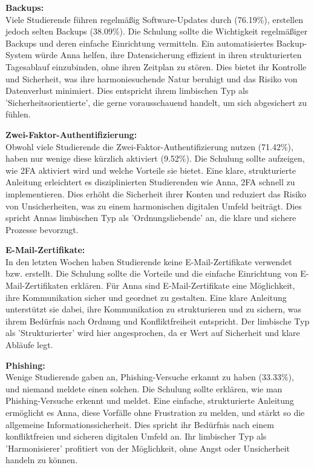 \documentclass[german,report]{i1thesis}
\begin{document}
\textbf{Backups:}\\
Viele Studierende führen regelmäßig Software-Updates durch (76.19\%), erstellen jedoch selten Backups (38.09\%). Die Schulung sollte die Wichtigkeit regelmäßiger Backups und deren einfache Einrichtung vermitteln. Ein automatisiertes Backup-System würde Anna helfen, ihre Datensicherung effizient in ihren strukturierten Tagesablauf einzubinden, ohne ihren Zeitplan zu stören. Dies bietet ihr Kontrolle und Sicherheit, was ihre harmoniesuchende Natur beruhigt und das Risiko von Datenverlust minimiert. Dies entspricht ihrem limbischen Typ als 'Sicherheitsorientierte', die gerne vorausschauend handelt, um sich abgesichert zu fühlen.

\textbf{Zwei-Faktor-Authentifizierung:}\\
Obwohl viele Studierende die Zwei-Faktor-Authentifizierung nutzen (71.42\%), haben nur wenige diese kürzlich aktiviert (9.52\%). Die Schulung sollte aufzeigen, wie 2FA aktiviert wird und welche Vorteile sie bietet. Eine klare, strukturierte Anleitung erleichtert es disziplinierten Studierenden wie Anna, 2FA schnell zu implementieren. Dies erhöht die Sicherheit ihrer Konten und reduziert das Risiko von Unsicherheiten, was zu einem harmonischen digitalen Umfeld beiträgt. Dies spricht Annas limbischen Typ als 'Ordnungsliebende' an, die klare und sichere Prozesse bevorzugt.

\textbf{E-Mail-Zertifikate:}\\
In den letzten Wochen haben Studierende keine E-Mail-Zertifikate verwendet bzw. erstellt. Die Schulung sollte die Vorteile und die einfache Einrichtung von E-Mail-Zertifikaten erklären. Für Anna sind E-Mail-Zertifikate eine Möglichkeit, ihre Kommunikation sicher und geordnet zu gestalten. Eine klare Anleitung unterstützt sie dabei, ihre Kommunikation zu strukturieren und zu sichern, was ihrem Bedürfnis nach Ordnung und Konfliktfreiheit entspricht. Der limbische Typ als 'Strukturierter' wird hier angesprochen, da er Wert auf Sicherheit und klare Abläufe legt.

\textbf{Phishing:}\\
Wenige Studierende gaben an, Phishing-Versuche erkannt zu haben (33.33\%), und niemand meldete einen solchen. Die Schulung sollte erklären, wie man Phishing-Versuche erkennt und meldet. Eine einfache, strukturierte Anleitung ermöglicht es Anna, diese Vorfälle ohne Frustration zu melden, und stärkt so die allgemeine Informationssicherheit. Dies spricht ihr Bedürfnis nach einem konfliktfreien und sicheren digitalen Umfeld an. Ihr limbischer Typ als 'Harmonisierer' profitiert von der Möglichkeit, ohne Angst oder Unsicherheit handeln zu können.
\end{document}
